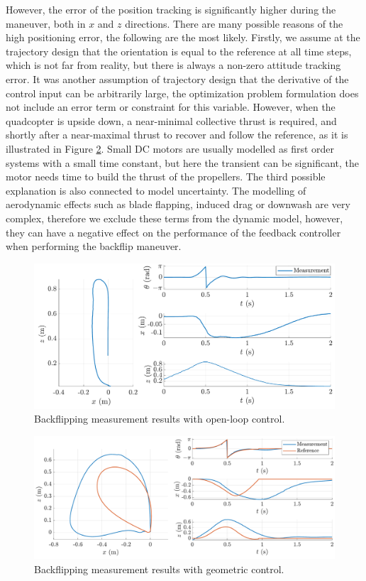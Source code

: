 However, the error of the position tracking is significantly higher during the maneuver, both in $x$ and $z$ directions. There are many possible reasons of the high positioning error, the following are the most likely. Firstly, we assume at the trajectory design that the orientation is equal to the reference at all time steps, which is not far from reality, but there is always a non-zero attitude tracking error. It was another assumption of trajectory design that the derivative of the control input can be arbitrarily large, the optimization problem formulation does not include an error term or constraint for this variable. However, when the quadcopter is upside down, a near-minimal collective thrust is required, and shortly after a near-maximal thrust to recover and follow the reference, as it is illustrated in Figure \ref{fig:geommeas}. Small DC motors are usually modelled as first order systems with a small time constant, but here the transient can be significant, the motor needs time to build the thrust of the propellers. The third possible explanation is also connected to model uncertainty. The modelling of aerodynamic effects such as blade flapping, induced drag or downwash \cite{quad_model} are very complex, therefore we exclude these terms from the dynamic model, however, they can have a negative effect on the performance of the feedback controller when performing the backflip maneuver.

\begin{figure}
\centering
\includegraphics[width=\linewidth]{Fig/openmeast.pdf}
\caption{Backflipping measurement results with open-loop control.}\label{fig:openmeas}
\end{figure}

\begin{figure}
\centering
\includegraphics[width=\linewidth]{Fig/geommeast2.pdf}
\caption{Backflipping measurement results with geometric control.}\label{fig:geommeas}
\end{figure}

